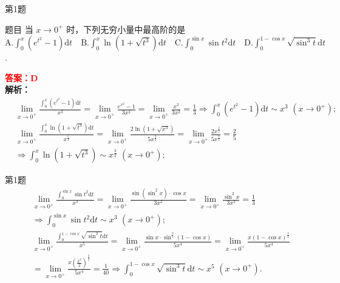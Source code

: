 \documentclass[aspectratio=169]{beamer}
\begin{document}
\begin{frame}{第1题}
\begin{block}{题目}
当 $x\to 0^+$ 时，下列无穷小量中最高阶的是
$\mathrm{A.}\int_{0}^{x}(e^{t^{2}}-1)\mathrm{d}t \quad
\mathrm{B.}\int_{0}^{x}\ln (1+\sqrt{t^{3}})\mathrm{d}t \quad
\mathrm{C.}\int_{0}^{\sin x}\sin t^{2}\mathrm{d}t \quad
\mathrm{D.}\int_{0}^{1-\cos x}\sqrt{\sin^{3}t}\mathrm{d}t$.
\end{block}
\textcolor{red}{\textbf{答案：}$\mathbf{D}$} \\
\textbf{解析：}
\begin{align*}
&\underset{x\rightarrow 0^+}{\lim}\frac{\int_0^x{\left( e^{t^2}-1 \right) \mathrm{d}t}}{x^3}=\underset{x\rightarrow 0^+}{\lim}\frac{e^{x^2}-1}{3x^2}=\underset{x\rightarrow 0^+}{\lim}\frac{x^2}{3x^2}=\frac{1}{3}
\Longrightarrow \int_0^x{\left( e^{t^2}-1 \right) \mathrm{d}t}\sim x^3\,\,\left( x\rightarrow 0^+ \right) ;
\\
&\underset{x\rightarrow 0^+}{\lim}\frac{\int_0^x{\ln \left( 1+\sqrt{t^3} \right)}\mathrm{d}t}{x^{\frac{5}{2}}}=\underset{x\rightarrow 0^+}{\lim}\frac{2\ln \left( 1+\sqrt{x^3} \right)}{5x^{\frac{3}{2}}}=\underset{x\rightarrow 0^+}{\lim}\frac{2x^{\frac{3}{2}}}{5x^{\frac{3}{2}}}=\frac{2}{5}
\\
&\Longrightarrow \int_0^x{\ln \left( 1+\sqrt{t^3} \right)}\sim x^{\frac{3}{2}}\,\,\left( x\rightarrow 0^+ \right) ;
\end{align*}
\end{frame}

\begin{frame}{第1题}
\begin{align*}
&\underset{x\rightarrow 0^+}{\lim}\frac{\int_0^{\sin x}{\sin t^2\mathrm{d}t}}{x^3}=\underset{x\rightarrow 0^+}{\lim}\frac{\sin \left( \sin ^2x \right) \cdot \cos x}{3x^2}=\underset{x\rightarrow 0^+}{\lim}\frac{\sin ^2x}{3x^2}=\frac{1}{3}
\\
&\Longrightarrow \int_0^{\sin x}{\sin t^2\mathrm{d}t}\sim x^3\,\,\left( x\rightarrow 0^+ \right) ;
\\
&\underset{x\rightarrow 0^+}{\lim}\frac{\int_0^{1-\cos x}{\sqrt{\sin ^3t}\mathrm{d}t}}{x^5}=\underset{x\rightarrow 0^+}{\lim}\frac{\sin x\cdot \sin ^{\frac{3}{2}}\left( 1-\cos x \right)}{5x^4}=\underset{x\rightarrow 0^+}{\lim}\frac{x\left( 1-\cos x \right) ^{\frac{3}{2}}}{5x^4}
\\
&=\underset{x\rightarrow 0^+}{\lim}\frac{x\left( \frac{x^2}{2} \right) ^{\frac{3}{2}}}{5x^4}=\frac{1}{40}\Longrightarrow \int_0^{1-\cos x}{\sqrt{\sin ^3t}\mathrm{d}t}\sim x^5\,\,\left( x\rightarrow 0^+ \right) .
\end{align*}
\end{frame}
\end{document}
